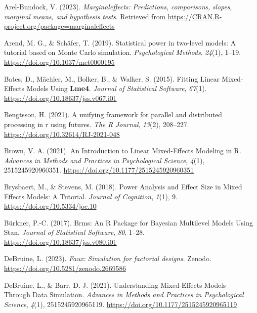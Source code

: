 \documentclass[
  man,floatsintext]{apa6}
\newlength{\cslhangindent}
\newlength{\cslentryspacingunit} %
\newenvironment{CSLReferences}[2] %
 {%
  \setlength{\parindent}{0pt}
  \ifodd #1
  \let\oldpar\par
  \def\par{\hangindent=\cslhangindent\oldpar}
  \fi
  \setlength{\parskip}{#2\cslentryspacingunit}
 }%
 {}
\begin{document}
\hypertarget{refs}{}
\begin{CSLReferences}{1}{0}
\leavevmode{}%
Arel-Bundock, V. (2023). \emph{Marginaleffects: Predictions, comparisons, slopes, marginal means, and hypothesis tests}. Retrieved from \url{https://CRAN.R-project.org/package=marginaleffects}

\leavevmode{}%
Arend, M. G., \& Schäfer, T. (2019). Statistical power in two-level models: {A} tutorial based on {Monte Carlo} simulation. \emph{Psychological Methods}, \emph{24}(1), 1--19. \url{https://doi.org/10.1037/met0000195}

\leavevmode{}%
Bates, D., Mächler, M., Bolker, B., \& Walker, S. (2015). Fitting {Linear Mixed-Effects Models Using} {\textbf{Lme4}}. \emph{Journal of Statistical Software}, \emph{67}(1). \url{https://doi.org/10.18637/jss.v067.i01}

\leavevmode{}%
Bengtsson, H. (2021). A unifying framework for parallel and distributed processing in r using futures. \emph{The R Journal}, \emph{13}(2), 208--227. \url{https://doi.org/10.32614/RJ-2021-048}

\leavevmode{}%
Brown, V. A. (2021). An {Introduction} to {Linear Mixed-Effects Modeling} in {R}. \emph{Advances in Methods and Practices in Psychological Science}, \emph{4}(1), 2515245920960351. \url{https://doi.org/10.1177/2515245920960351}

\leavevmode{}%
Brysbaert, M., \& Stevens, M. (2018). Power {Analysis} and {Effect Size} in {Mixed Effects Models}: {A Tutorial}. \emph{Journal of Cognition}, \emph{1}(1), 9. \url{https://doi.org/10.5334/joc.10}

\leavevmode{}%
Bürkner, P.-C. (2017). Brms: {An R Package} for {Bayesian Multilevel Models Using Stan}. \emph{Journal of Statistical Software}, \emph{80}, 1--28. \url{https://doi.org/10.18637/jss.v080.i01}

\leavevmode{}%
DeBruine, L. (2023). \emph{Faux: Simulation for factorial designs}. Zenodo. \url{https://doi.org/10.5281/zenodo.2669586}

\leavevmode{}%
DeBruine, L., \& Barr, D. J. (2021). Understanding {Mixed-Effects Models Through Data Simulation}. \emph{Advances in Methods and Practices in Psychological Science}, \emph{4}(1), 2515245920965119. \url{https://doi.org/10.1177/2515245920965119}


\end{CSLReferences}
\end{document}

